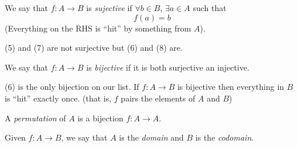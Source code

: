 \documentclass{article}
\begin{document}
\begin{defi}[Surjective]
    We say that $f: A \rightarrow B$ is \emph{sujective} if $\forall b \in B$, $\exists a \in A$ such that
    \[
        f(a) = b  
    \]
    (Everything on the RHS is ``hit'' by something from $A$).
\end{defi}
\begin{eg}
    (5) and (7) are not surjective but (6) and (8) are.
\end{eg}

\begin{defi}[Bijective]
    We say that $f: A \rightarrow B$ is \emph{bijective} if it is both surjective an injective.
\end{defi}
\begin{eg}
    (6) is the only bijection on our list. 
    If $f: A \rightarrow B$ is bijective then everything in $B$ is ``hit'' exactly once. 
    (that is, $f$ pairs the elements of $A$ and $B$)
\end{eg}

\begin{defi}[Permutation]
    A \emph{permutation} of $A$ is a bijection $f: A \rightarrow A$.
\end{defi}

\begin{defi}
    Given $f: A \rightarrow B$, we say that $A$ is the \emph{domain} and $B$ is the \emph{codomain}.
\end{defi}
\end{document}
